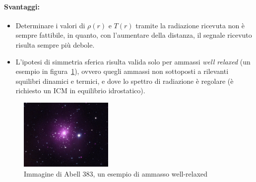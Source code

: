 \paragraph*{Svantaggi:}
\begin{itemize}
    \item Determinare i valori di $\rho(r)$ e $T(r)$ tramite la radiazione ricevuta non è sempre fattibile, in quanto, con l’aumentare della distanza, il segnale ricevuto risulta sempre più debole. 
    \item L’ipotesi di simmetria sferica risulta valida solo per ammassi \emph{well relaxed} (un esempio in figura~\ref{fig:well-relaxed-cluster}), ovvero quegli ammassi non sottoposti a rilevanti squilibri dinamici e termici, e dove lo spettro di radiazione è regolare (è richiesto un ICM in equilibrio idrostatico).
\end{itemize}
\begin{figure}[htb]
    \centering
    \includegraphics[width = 0.4\textwidth]{immagini/relaxed-cluster.png}
    \caption{Immagine di Abell 383, un esempio di ammasso well-relaxed}
    \label{fig:well-relaxed-cluster}
\end{figure}
